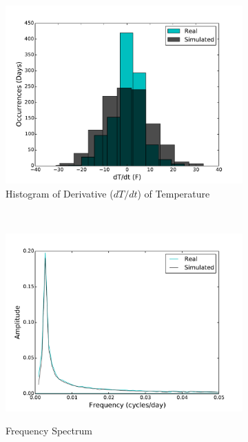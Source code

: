 \documentclass[11pt, letterpaper]{article}
\begin{document}
\begin{figure}[H]
\begin{subfigure}[b]{0.45\textwidth}
    \includegraphics[width=\textwidth]{figures/sim_vel_hist.pdf}
    \caption{\label{fig:analysis-autocorr} Histogram of Derivative ($dT/dt$) of Temperature}
  \end{subfigure}
  ~
  \begin{subfigure}[b]{0.45\textwidth}
    \includegraphics[width=\textwidth]{figures/sim_temp_fft.pdf}
    \label{fig:analysis-ft}
    \caption{Frequency Spectrum}
  \end{subfigure}
  
  \label{fig:analysis}
  \caption{}
\end{figure}
\end{document}
